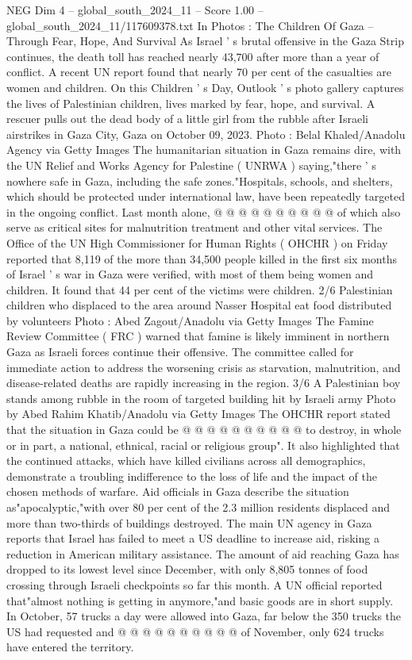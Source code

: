 \begin{textsample}{NEG Dim 4 – global\_south\_2024\_11 – Score 1.00 – global\_south\_2024\_11/117609378.txt}  \label{ex:f4_neg_176}
In Photos : The Children Of Gaza -- Through Fear, Hope, And Survival As Israel ' s brutal offensive in the Gaza Strip continues, the death toll has reached nearly 43,700 after more than a year of conflict.
A recent UN report found that nearly 70 per cent of the casualties are women and children.
On this Children ' s Day, Outlook ' s photo gallery captures the lives of Palestinian children, lives marked by fear, hope, and survival.
A rescuer pulls out the dead body of a little girl from the rubble after Israeli airstrikes in Gaza City, Gaza on October 09, 2023.
Photo : Belal Khaled/Anadolu Agency via Getty Images The humanitarian situation in Gaza remains dire, with the UN Relief and Works Agency for Palestine ( UNRWA ) saying,"there ' s nowhere safe in Gaza, including the safe zones."Hospitals, schools, and shelters, which should be protected under international law, have been repeatedly targeted in the ongoing conflict.
Last month alone, @ @ @ @ @ @ @ @ @ @ of which also serve as critical sites for malnutrition treatment and other vital services.
The Office of the UN High Commissioner for Human Rights ( OHCHR ) on Friday reported that 8,119 of the more than 34,500 people killed in the first six months of Israel ' s war in Gaza were verified, with most of them being women and children.
It found that 44 per cent of the victims were children. 2/6 Palestinian children who displaced to the area around Nasser Hospital eat food distributed by volunteers Photo : Abed Zagout/Anadolu via Getty Images The Famine Review Committee ( FRC ) warned that famine is likely imminent in northern Gaza as Israeli forces continue their offensive.
The committee called for immediate action to address the worsening crisis as starvation, malnutrition, and disease-related deaths are rapidly increasing in the region. 3/6 A Palestinian boy stands among rubble in the room of targeted building hit by Israeli army Photo by Abed Rahim Khatib/Anadolu via Getty Images The OHCHR report stated that the situation in Gaza could be @ @ @ @ @ @ @ @ @ @ to destroy, in whole or in part, a national, ethnical, racial or religious group".
It also highlighted that the continued attacks, which have killed civilians across all demographics, demonstrate a troubling indifference to the loss of life and the impact of the chosen methods of warfare.
Aid officials in Gaza describe the situation as"apocalyptic,"with over 80 per cent of the 2.3 million residents displaced and more than two-thirds of buildings destroyed.
The main UN agency in Gaza reports that Israel has failed to meet a US deadline to increase aid, risking a reduction in American military assistance.
The amount of aid reaching Gaza has dropped to its lowest level since December, with only 8,805 tonnes of food crossing through Israeli checkpoints so far this month.
A UN official reported that"almost nothing is getting in anymore,"and basic goods are in short supply.
In October, 57 trucks a day were allowed into Gaza, far below the 350 trucks the US had requested and @ @ @ @ @ @ @ @ @ @ of November, only 624 trucks have entered the territory.

\end{textsample}
